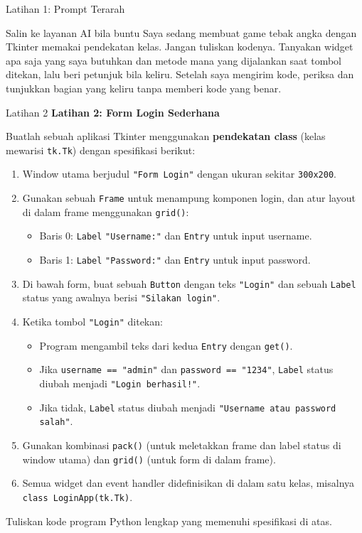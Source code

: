 \documentclass[aspectratio=169, table]{beamer}
\begin{document}
\begin{frame}{Latihan 1: Prompt Terarah}
\begin{block}{Salin ke layanan AI bila buntu}
\small Saya sedang membuat game tebak angka dengan Tkinter memakai pendekatan kelas. Jangan tuliskan kodenya. Tanyakan widget apa saja yang saya butuhkan dan metode mana yang dijalankan saat tombol ditekan, lalu beri petunjuk bila keliru. Setelah saya mengirim kode, periksa dan tunjukkan bagian yang keliru tanpa memberi kode yang benar.
\end{block}
\end{frame}

\begin{frame}[fragile,allowframebreaks=0.8]{Latihan 2}
\footnotesize
\textbf{Latihan 2: Form Login Sederhana}\par\medskip
Buatlah sebuah aplikasi Tkinter menggunakan \textbf{pendekatan class} (kelas mewarisi \texttt{tk.Tk}) dengan spesifikasi berikut:
  \begin{enumerate}
    \item Window utama berjudul \texttt{"Form Login"} dengan ukuran sekitar \texttt{300x200}.
    \item Gunakan sebuah \texttt{Frame} untuk menampung komponen login, dan atur layout di dalam frame menggunakan \texttt{grid()}:
          \begin{itemize}
            \item Baris 0: \texttt{Label} \texttt{"Username:"} dan \texttt{Entry} untuk input username.
            \item Baris 1: \texttt{Label} \texttt{"Password:"} dan \texttt{Entry} untuk input password.
          \end{itemize}
    \item Di bawah form, buat sebuah \texttt{Button} dengan teks \texttt{"Login"} dan sebuah \texttt{Label} status yang awalnya berisi \texttt{"Silakan login"}.
    \item Ketika tombol \texttt{"Login"} ditekan:
          \begin{itemize}
            \item Program mengambil teks dari kedua \texttt{Entry} dengan \texttt{get()}.
            \item Jika \texttt{username == "admin"} dan \texttt{password == "1234"}, \texttt{Label} status diubah menjadi \texttt{"Login berhasil!"}.
            \item Jika tidak, \texttt{Label} status diubah menjadi \texttt{"Username atau password salah"}.
          \end{itemize}
    \item Gunakan kombinasi \texttt{pack()} (untuk meletakkan frame dan label status di window utama) dan \texttt{grid()} (untuk form di dalam frame).
    \item Semua widget dan event handler didefinisikan di dalam satu kelas, misalnya \texttt{class LoginApp(tk.Tk)}.
  \end{enumerate}
  Tuliskan kode program Python lengkap yang memenuhi spesifikasi di atas.
\end{frame}
\end{document}
